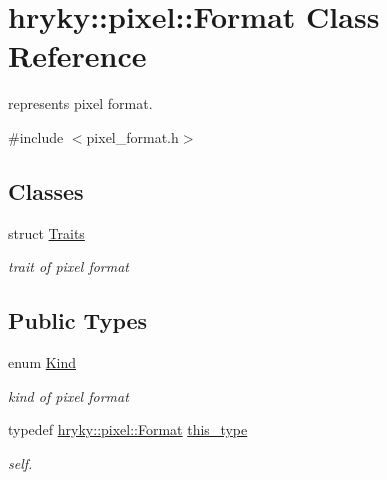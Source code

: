\hypertarget{classhryky_1_1pixel_1_1_format}{\section{hryky\-:\-:pixel\-:\-:Format Class Reference}
\label{classhryky_1_1pixel_1_1_format}
}


represents pixel format.  




{\ttfamily \#include $<$pixel\-\_\-format.\-h$>$}

\subsection*{Classes}
\begin{DoxyCompactItemize}
\item 
struct \hyperlink{structhryky_1_1pixel_1_1_format_1_1_traits}{Traits}
\begin{DoxyCompactList}\small\item\em trait of pixel format \end{DoxyCompactList}\end{DoxyCompactItemize}
\subsection*{Public Types}
\begin{DoxyCompactItemize}
\item 
enum \hyperlink{classhryky_1_1pixel_1_1_format_ac65267000940a3f9a74c01f82ed616e4}{Kind} 
\begin{DoxyCompactList}\small\item\em kind of pixel format \end{DoxyCompactList}\item 
\hypertarget{classhryky_1_1pixel_1_1_format_a020a3436c6988f39e98d127ecb85c000}{typedef \hyperlink{classhryky_1_1pixel_1_1_format}{hryky\-::pixel\-::\-Format} \hyperlink{classhryky_1_1pixel_1_1_format_a020a3436c6988f39e98d127ecb85c000}{this\-\_\-type}}\label{classhryky_1_1pixel_1_1_format_a020a3436c6988f39e98d127ecb85c000}

\begin{DoxyCompactList}\small\item\em self. \end{DoxyCompactList}\end{DoxyCompactItemize}
